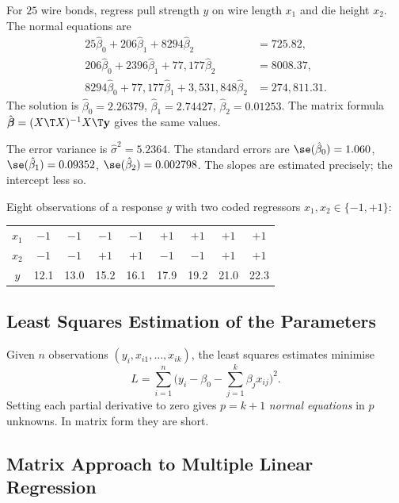 \begin{example}
For $25$ wire bonds, regress pull strength $y$ on wire length $x_1$ and die height $x_2$. The normal equations are
\begin{align*}
25\hat\beta_0+206\hat\beta_1+8294\hat\beta_2&=725.82,\\
206\hat\beta_0+2396\hat\beta_1+77{,}177\hat\beta_2&=8008.37,\\
8294\hat\beta_0+77{,}177\hat\beta_1+3{,}531{,}848\hat\beta_2&=274{,}811.31.
\end{align*}
The solution is $\hat\beta_0=2.26379$, $\hat\beta_1=2.74427$, $\hat\beta_2=0.01253$. The matrix formula $\hat{\boldsymbol\beta}=(X\T X)^{-1}X\T\mathbf{y}$ gives the same values.

The error variance is $\hat\sigma^2=5.2364$. The standard errors are $\se(\hat\beta_0)=1.060$, $\se(\hat\beta_1)=0.09352$, $\se(\hat\beta_2)=0.002798$. The slopes are estimated precisely; the intercept less so.
\end{example}

\begin{example}\label{ex:mlrdata}
Eight observations of a response $y$ with two coded regressors $x_1,x_2\in\{-1,+1\}$:
\begin{center}
\begin{tabular}{c|cccccccc}
\toprule
$x_1$ & $-1$ & $-1$ & $-1$ & $-1$ & $+1$ & $+1$ & $+1$ & $+1$\\
$x_2$ & $-1$ & $-1$ & $+1$ & $+1$ & $-1$ & $-1$ & $+1$ & $+1$\\
$y$ & 12.1 & 13.0 & 15.2 & 16.1 & 17.9 & 19.2 & 21.0 & 22.3\\
\bottomrule
\end{tabular}
\end{center}
\end{example}

\subsection{Least Squares Estimation of the Parameters}

Given $n$ observations $(y_i,x_{i1},\dots,x_{ik})$, the least squares estimates minimise
\[ L=\sum_{i=1}^n\Big(y_i-\beta_0-\sum_{j=1}^k\beta_jx_{ij}\Big)^2. \]
Setting each partial derivative to zero gives $p=k+1$ \emph{normal equations} in $p$ unknowns. In matrix form they are short.

\subsection{Matrix Approach to Multiple Linear Regression}

